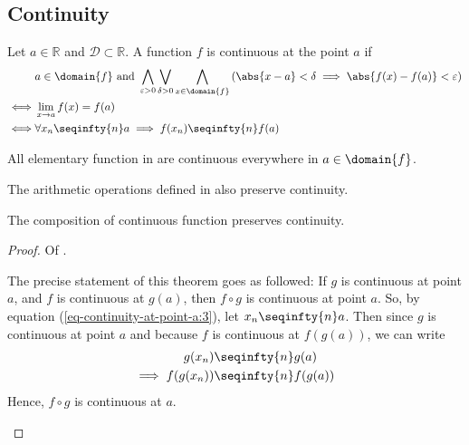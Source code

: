 \subsection{Continuity}\label{subsec-continuity}

\begin{definition}\label{def-continuity-at-point-a}
	Let $a\in\mathbb{R}$ and $\mathcal{D}\subset\mathbb{R}$. A function $f$ is
	continuous at the point $a$ if
	\begin{align}
		 & a\in\domain{f}\text{ and }\bigwedge_{\varepsilon>0}\bigvee_{\delta>0}\bigwedge_{x\in\domain{f}}
		\left(\abs{x-a}<\delta\implies\abs{f(x)-f(a)}<\varepsilon\right)\label{eq-continuity-at-point-a:1} \\
		\iff
		 & \lim_{x \to a}f(x) = f(a)\label{eq-continuity-at-point-a:2}                                     \\
		\iff
		 & \forall x_n \seqinfty{n} a \implies f(x_n) \seqinfty{n} f(a)\label{eq-continuity-at-point-a:3}
	\end{align}
\end{definition}

\begin{thm}\label{thm-elementary-functions-continuous}
	All elementary function in  are
	continuous everywhere in $a\in\domain{f}$.
\end{thm}

\begin{thm}\label{thm-arithmetic-continuous}
	The arithmetic operations defined in 
	also preserve continuity.
\end{thm}

\begin{thm}\label{thm-composition-continuous}
	The composition of continuous function preserves continuity.
\end{thm}

\begin{proof}
	Of .
	\begin{flushleft}
		The precise statement of this theorem goes as followed: If  $g$ is continuous
		at point $a$, and $f$ is continuous at $g(a)$, then $f \circ g$ is continuous
		at point $a$. So, by equation (\ref{eq-continuity-at-point-a:3}), let
		$x_n \seqinfty{n} a$. Then since $g$ is continuous at point $a$ and because $f$
		is continuous at $f(g(a))$, we can write
		\begin{align*}
			g(x_n)    & \seqinfty{n} g(a)    \\
			\implies
			f(g(x_n)) & \seqinfty{n} f(g(a))
		\end{align*}
		Hence, $f \circ g$ is continuous at $a$.
	\end{flushleft}
\end{proof}

